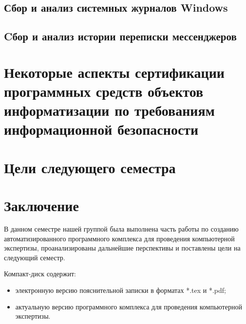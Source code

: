 \documentclass[russian,utf8,14pt,simple]{eskdtext}
\begin{document}
\subsection{Сбор и анализ системных журналов Windows} %
\setcounter{figure}{0}

\subsection{Cбор и анализ истории переписки мессенджеров} %
\setcounter{figure}{0}


\section{Некоторые аспекты сертификации программных средств объектов\\ информатизации по требованиям информационной безопасности} %
\setcounter{figure}{0}


\newpage
\section{Цели следующего семестра}


\section{Заключение}
В данном семестре нашей группой была выполнена часть работы по созданию автоматизированного программного комплекса для проведения компьютерной экспертизы, проанализированы дальнейшие перспективы и поставлены цели на следующий семестр.

\newpage
\renewcommand{\refname}{Список использованных источников}


Компакт-диск содержит: 
\begin{itemize}
\item электронную версию пояснительной записки в форматах *.tex и *.pdf;
\item актуальную версию программного комплекса для проведения компьютерной экспертизы.
\end{itemize}
\end{document}
